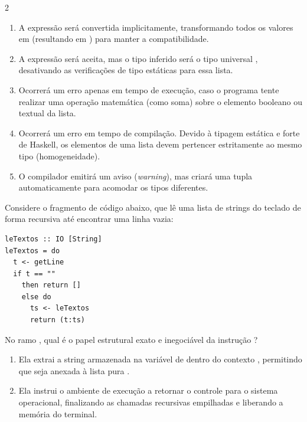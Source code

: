 \documentclass[a4paper,10pt,brazil]{article}
\begin{document}
\begin{multicols}{2}
\begin{enumerate}
  \item A expressão será convertida implicitamente, transformando todos os valores em  (resultando em ) para manter a compatibilidade.

  \item A expressão será aceita, mas o tipo inferido será o tipo universal , desativando as verificações de tipo estáticas para essa lista.

  \item Ocorrerá um erro apenas em tempo de execução, caso o programa tente realizar uma operação matemática (como soma) sobre o elemento booleano ou textual da lista.

  \item Ocorrerá um erro em tempo de compilação. Devido à tipagem estática e forte de Haskell, os elementos de uma lista devem pertencer estritamente ao mesmo tipo (homogeneidade).

  \item O compilador emitirá um aviso (\emph{warning}), mas criará uma tupla automaticamente para acomodar os tipos diferentes.


\end{enumerate}

Considere o fragmento de código abaixo, que lê uma lista de strings do teclado de forma recursiva até encontrar uma linha vazia:

\begin{verbatim}
leTextos :: IO [String]
leTextos = do
  t <- getLine
  if t == "" 
    then return []
    else do
      ts <- leTextos
      return (t:ts)
\end{verbatim}

No ramo , qual é o papel estrutural exato e inegociável da instrução ?

\begin{enumerate}
  \item Ela extrai a string armazenada na variável  de dentro do contexto , permitindo que seja anexada à lista pura .

  \item Ela instrui o ambiente de execução a retornar o controle para o sistema operacional, finalizando as chamadas recursivas empilhadas e liberando a memória do terminal.


\end{enumerate}
\end{multicols}
\end{document}
